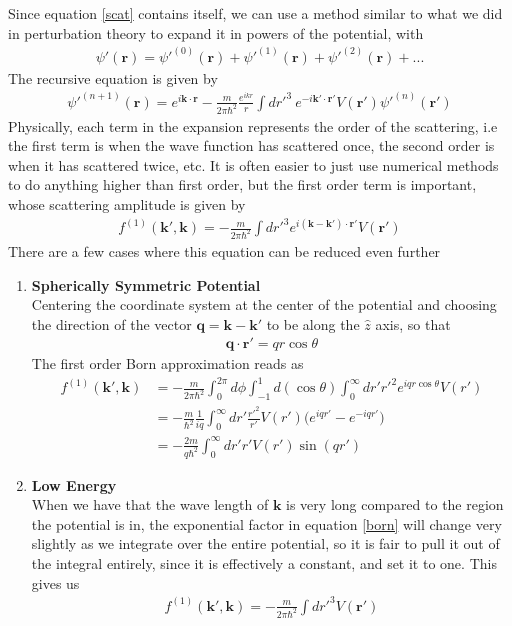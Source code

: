 Since equation \ref{scat} contains itself, we can use a method similar to what we did in perturbation theory to expand it in powers of the potential, with %
\begin{align}
\psi'(\textbf{r}) = \psi'^{(0)}(\textbf{r}) + \psi'^{(1)}(\textbf{r}) + \psi'^{(2)}(\textbf{r}) + ...
\end{align}
The recursive equation is given by
\begin{align}
\psi'^{(n+1)}(\textbf{r}) = e^{i\textbf{k}\cdot\textbf{r}} -\frac{m}{2\pi\hbar^2}\frac{e^{ikr}}{r}\int dr'^3~ e^{-i\textbf{k}'\cdot\textbf{r}' } V(\textbf{r}')\psi'^{(n)}(\textbf{r}')
\end{align}
Physically, each term in the expansion represents the order of the scattering, i.e the first term is when the wave function has scattered once, the second order is when it has scattered twice, etc. It is often easier to just use numerical methods to do anything higher than first order, but the first order term is important, whose scattering amplitude is given by
\begin{align}\label{born}
f^{(1)}(\textbf{k}', \textbf{k}) = -\frac{m}{2\pi\hbar^2} \int dr'^3 e^{i(\textbf{k}-\textbf{k}')\cdot\textbf{r}'}V(\textbf{r}')
\end{align}
There are a few cases where this equation can be reduced even further

\begin{enumerate}

\item \textbf{Spherically Symmetric Potential}\\
Centering the coordinate system at the center of the potential and choosing the direction of the vector $\textbf{q} = \textbf{k}-\textbf{k}'$ to be along the $\hat{z}$ axis, so that
\begin{align}
\textbf{q}\cdot\textbf{r}' = qr\cos\theta
\end{align}
The first order Born approximation reads as 
\begin{align}\label{born}
f^{(1)}(\textbf{k}', \textbf{k}) &= -\frac{m}{2\pi\hbar^2} \int_0^{2\pi}d\phi  \int_{-1}^1 d(\cos\theta) \int_0^\infty dr' r'^2e^{iqr\cos\theta}V(r')\\
&= -\frac{m}{\hbar^2}\frac{1}{iq}\int_0^\infty dr' \frac{r'^2}{r'}V(r')\Big(e^{iqr'} - e^{-iqr'}\Big)\\
&= -\frac{2m}{q\hbar^2}\int_0^\infty dr' r' V(r')\sin(qr')
\end{align}




\item \textbf{Low Energy}\\
When we have that the wave length of $\textbf{k}$ is very long compared to the region the potential is in, the exponential factor in equation \ref{born} will change very slightly as we integrate over the entire potential, so it is fair to pull it out of the integral entirely, since it is effectively a constant, and set it to one. This gives us
\begin{align}
f^{(1)}(\textbf{k}',\textbf{k}) = -\frac{m}{2\pi\hbar^2} \int dr'^3 V(\textbf{r}')
\end{align}

\end{enumerate}